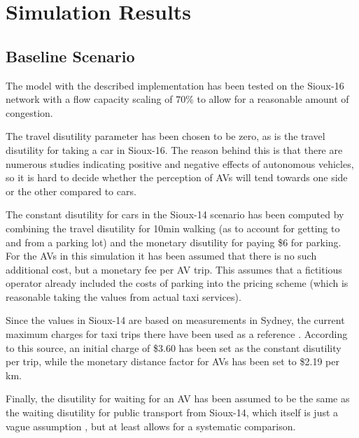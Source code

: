 \section{Simulation Results}
\label{sec:results}

\subsection{Baseline Scenario}
\label{sec:baselinesc}

The model with the described implementation has been tested on the Sioux-16 network
with a flow capacity scaling of $70\%$ to allow for a reasonable amount of congestion.

The travel disutility parameter has been chosen to be zero, as is the travel
disutility for taking a car in Sioux-16. The reason behind this is that there are
numerous studies indicating positive and negative effects of autonomous vehicles, so
it is hard to decide whether the perception of AVs will tend towards one side or the
other compared to cars.

The constant disutility for cars in the Sioux-14 scenario
has been computed by combining the travel disutility for 10min walking (as to
account for getting to and from a parking lot) and the monetary disutility for
paying \$6 for parking. For the AVs in this simulation it has been assumed that
there is no such additional cost, but a monetary fee per AV trip. This
assumes that a fictitious operator already included the costs of parking into the
pricing scheme (which is reasonable taking the values from actual taxi services).

Since the values in Sioux-14 are based on measurements in Sydney, the current
maximum charges for taxi trips there have been used as a reference \citep{NSW2016}. According to this
source, an initial charge of \$3.60 has been set as the constant disutility per trip, while
the monetary distance factor for AVs has been set to \$2.19 per km.

Finally, the disutility for waiting for an AV has been assumed to be the same as
the waiting disutility for public transport from Sioux-14, which itself is just a
vague assumption \citep{Chakirov2014}, but at least allows for a systematic comparison.

